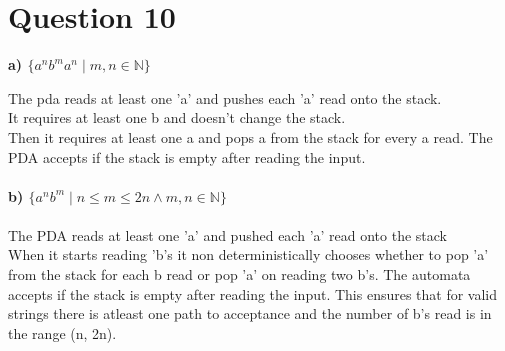 \documentclass[11pt]{article}
\begin{document}
\section*{Question 10}
\textbf{a) $\{a^nb^ma^n \;|\; m, n \in \mathbb{N}\}$} \\


The pda reads at least one 'a' and pushes each 'a' read onto the stack. \\
It requires at least one b and doesn't change the stack. \\
Then it requires at least one a and pops a from the stack for every a read.
The PDA accepts if the stack is empty after reading the input. \\
\\
\textbf{b) $\{a^nb^m \;|\; n \leq m \leq 2n \land m, n \in \mathbb{N}\}$} \\
\\
The PDA reads at least one 'a' and pushed each 'a' read onto the stack \\
When it starts reading 'b's it non deterministically chooses whether to pop 'a'
from the stack for each b read or pop 'a' on reading two b's. The automata accepts
if the stack is empty after reading the input. This ensures that for valid strings
there is atleast one path to acceptance and the number of b's read is in the range
(n, 2n).
\end{document}
